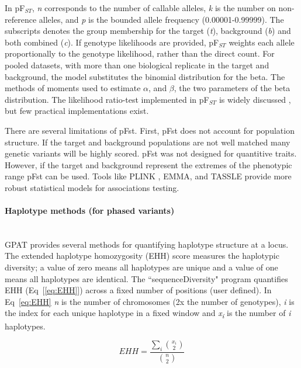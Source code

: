 \documentclass[10pt,letterpaper]{article}
\begin{document}
In pF$_{ST}$, \textit{n} corresponds to the number of callable alleles, \textit{k} is the number on non-reference alleles, and \textit{p} is the bounded allele frequency (0.00001-0.99999).  The subscripts denotes the group membership for the target (\textit{t}), background (\textit{b}) and both combined (\textit{c}).  If genotype likelihoods are provided, pF$_{ST}$  weights each allele proportionally to the genotype likelihood, rather than the direct count.   For pooled datasets, with more than one biological replicate in the target and background, the model substitutes the binomial distribution for the beta.  The methods of moments used to estimate $\alpha$, and $\beta$, the two parameters of the beta distribution.  The likelihood ratio-test implemented in pF$_{ST}$ is widely discussed \cite{kim,heng}, but few practical implementations exist.  

There are several limitations of pFst.  First, pFst does not account for population structure.  If the target and background populations are not well matched many genetic variants will be highly scored.  pFst was not designed for quantitive traits.  However, if the target and background represent the extremes of the phenotypic range pFst can be used.  Tools like PLINK \cite{plink}, EMMA\cite{emma}, and TASSLE\cite{tassel} provide more robust statistical models for associations testing.

\paragraph*{Haplotype methods (for phased variants) }\mbox{} \\

GPAT provides several methods for quantifying haplotype structure at a locus.  The extended haplotype homozygosity (EHH) score measures the haplotypic diversity; a value of zero means all haplotypes are unique and a value of one means all haplotypes are identical. The ``sequenceDiversity" program quantifies EHH (Eq~[\ref{eq:EHH}]) across a fixed number of positions (user defined). In Eq~\ref{eq:EHH} \textit{n} is the number of chromosomes (2x the number of genotypes), \textit{i} is the index for each unique haplotype in a fixed window and \textit{x\textsubscript{i}} is the number of \textit{i} haplotypes.  


\begin{equation}\label{eq:EHH} 
EHH=\frac{\sum_{i} \binom{x_i}{2}}{\binom{n}{2}}
\end{equation}
\end{document}
